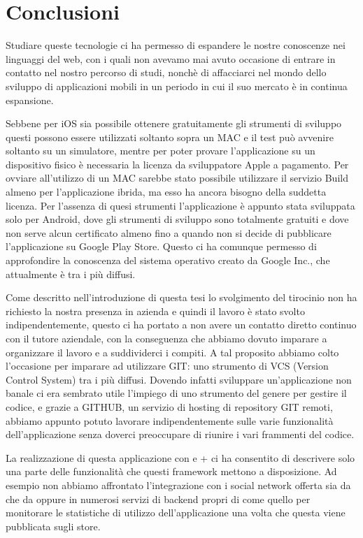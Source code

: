 \chapter{Conclusioni}
    Studiare queste tecnologie ci ha permesso di espandere le nostre
    conoscenze nei linguaggi del web, con i quali non avevamo mai avuto
    occasione di entrare in contatto nel nostro percorso di studi, nonchè di
    affacciarci nel mondo dello sviluppo di applicazioni mobili in un periodo in
    cui il suo mercato è in continua espansione.

    Sebbene per iOS
    sia possibile ottenere gratuitamente gli strumenti di sviluppo questi
    possono essere utilizzati soltanto sopra un MAC e il test può avvenire
    soltanto su un simulatore, mentre per poter provare l'applicazione su un
    dispositivo fisico è necessaria la licenza da sviluppatore Apple a
    pagamento. Per ovviare all'utilizzo di un MAC sarebbe stato
    possibile utilizzare il servizio \pg{} Build almeno per l'applicazione
    ibrida, ma
    esso ha ancora bisogno della suddetta licenza. Per l'assenza di quesi
    strumenti l'applicazione è appunto stata sviluppata solo per Android, dove
    gli strumenti di sviluppo sono totalmente gratuiti e dove non serve alcun
    certificato almeno fino a quando non si decide di pubblicare
    l'applicazione su Google Play Store.
    Questo ci ha comunque permesso di approfondire la
    conoscenza del sistema operativo creato da Google Inc., che attualmente è
    tra i più diffusi.

    Come descritto nell'introduzione di questa tesi lo svolgimento del
    tirocinio non ha richiesto la nostra presenza in azienda e quindi il
    lavoro è stato svolto indipendentemente, questo ci ha portato a non avere
    un contatto diretto continuo con il tutore aziendale, con la conseguenza
    che abbiamo dovuto imparare a organizzare il lavoro e a suddividerci i
    compiti. A tal proposito abbiamo colto l'occasione per imparare ad
    utilizzare GIT: uno strumento di VCS (Version Control System) tra i più
    diffusi. Dovendo infatti sviluppare un'applicazione non banale ci era
    sembrato utile l'impiego di uno strumento del genere per gestire il codice,
    e grazie a GITHUB, un servizio di hosting  di repository GIT remoti, abbiamo
    appunto potuto lavorare indipendentemente sulle varie funzionalità
    dell'applicazione senza doverci preoccupare di riunire i vari frammenti
    del codice.

    La realizzazione di questa applicazione con \tisdk{} e \pg{}+\kendomob{}
    ci ha consentito di descrivere solo una parte delle funzionalità che
    questi framework mettono a disposizione. Ad esempio non abbiamo affrontato
    l'integrazione con i social network offerta sia da \tisdk{} che da \pg{}
    oppure in numerosi servizi di backend propri di \tisdk{} come quello per
    monitorare le statistiche di utilizzo dell'applicazione una volta che
    questa viene pubblicata sugli store.

